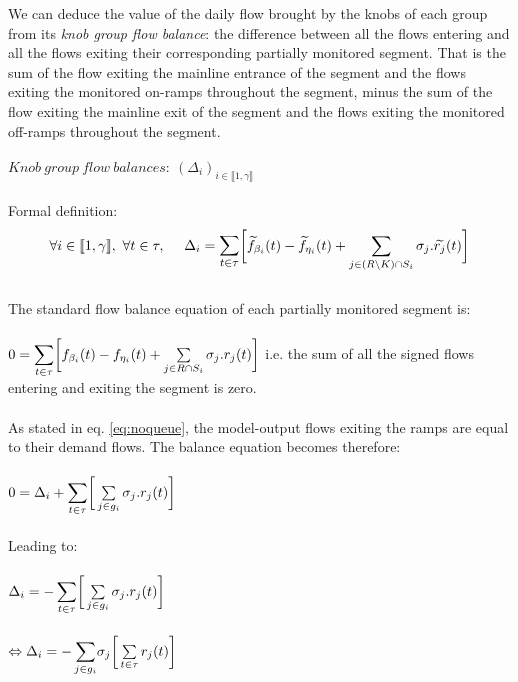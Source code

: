 We can deduce the value of the daily flow brought by the knobs of each group from its \emph{knob group flow balance}: the difference between all the flows entering and all the flows exiting their corresponding partially monitored segment. That is the sum of the flow exiting the mainline entrance of the segment and the flows exiting the monitored on-ramps throughout the segment, minus the sum of the flow exiting the mainline exit of the segment and the flows exiting the monitored off-ramps throughout the segment.\\ 
\\
$Knob\ group\ flow\ balances:\ (\Delta_{i})_{i\in \llbracket 1,\gamma \rrbracket} $\\
\\
Formal definition:\\
\begin{equation*}
\forall i \in \llbracket 1,\gamma \rrbracket,\ \forall t\in \tau,\ \ \ \ \Delta_{i} =\mathlarger{\sum\limits_{t\in \tau}}\bigg[\widetilde{f}_{\beta_{i}}(t)-\widetilde{f}_{\eta_{i}}(t)+\sum\limits_{j\in (R\backslash K)\cap S_{i}}\sigma_{j}.\widetilde{r_{j}}(t)\bigg]
\end{equation*}
\\
The standard flow balance equation of each partially monitored segment is:\\
\\
$0=\mathlarger{\sum\limits_{t\in \tau}}\bigg[f_{\beta_{i}}(t)-f_{\eta_{i}}(t)+\sum\limits_{j\in R\cap S_{i}}\sigma_{j}.r_{j}(t)\bigg]$   i.e. the sum of all the signed flows entering and exiting the segment is zero.\\
\\
As stated in eq. \ref{eq:noqueue}, the model-output flows exiting the ramps are equal to their demand flows. The balance equation becomes therefore:\\
\\
$0=\Delta_{i}+\mathlarger{\sum\limits_{t\in \tau}}\bigg[\sum\limits_{j\in g_{i}}\sigma_{j}.r_{j}(t)\bigg]$\\
\\
Leading to:\\
\\
$\Delta_{i}=\mathlarger{-\sum\limits_{t\in \tau}}\bigg[\sum\limits_{j\in g_{i}}\sigma_{j}.r_{j}(t)\bigg]$\\
\\
$\Leftrightarrow \Delta_{i}=\mathlarger{-\sum\limits_{j\in g_{i}}}\sigma_{j}\bigg[\sum\limits_{t\in \tau}r_{j}(t)\bigg]$\\
\\ 
